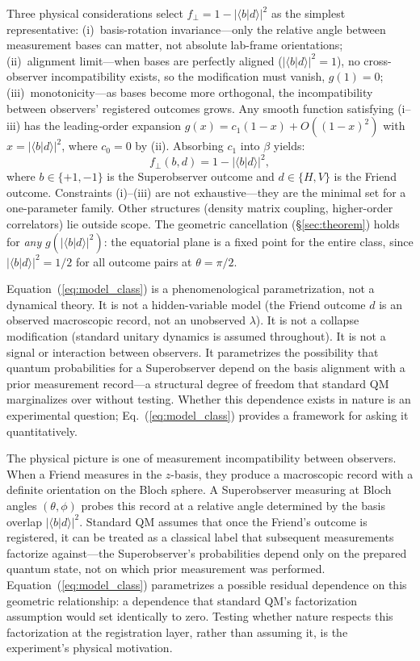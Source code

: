\documentclass[twocolumn,aps,pra,superscriptaddress,floatfix,10pt]{revtex4-2}
\begin{document}
Three physical considerations select $f_\perp = 1 - |\langle b|d\rangle|^2$ as
the simplest representative: (i)~basis-rotation invariance---only the relative
angle between measurement bases can matter, not absolute lab-frame orientations;
(ii)~alignment limit---when bases are perfectly aligned
($|\langle b|d\rangle|^2 = 1$), no cross-observer incompatibility exists, so
the modification must vanish, $g(1) = 0$; (iii)~monotonicity---as bases become
more orthogonal, the incompatibility between observers' registered outcomes
grows. Any smooth function satisfying (i--iii) has the leading-order expansion
$g(x) = c_1(1-x) + O((1-x)^2)$ with $x = |\langle b|d\rangle|^2$, where
$c_0 = 0$ by (ii). Absorbing $c_1$ into $\beta$ yields:
\begin{equation}
f_\perp(b,d) = 1 - |\langle b|d\rangle|^2,
\label{eq:fperp}
\end{equation}
where $b \in \{+1,-1\}$ is the Superobserver outcome and $d \in \{H,V\}$ is
the Friend outcome. Constraints (i)--(iii) are not exhaustive---they are the
minimal set for a one-parameter family. Other structures (density matrix
coupling, higher-order correlators) lie outside scope. The geometric
cancellation (\S\ref{sec:theorem}) holds for \emph{any}
$g(|\langle b|d\rangle|^2)$: the equatorial plane is a fixed point for the
entire class, since $|\langle b|d\rangle|^2 = 1/2$ for all outcome pairs at
$\theta = \pi/2$.

Equation~(\ref{eq:model_class}) is a phenomenological parametrization, not
a dynamical theory. It is not a hidden-variable model (the Friend outcome
$d$ is an observed macroscopic record, not an unobserved $\lambda$). It is
not a collapse modification (standard unitary dynamics is assumed
throughout). It is not a signal or interaction between observers. It
parametrizes the possibility that quantum probabilities for a Superobserver
depend on the basis alignment with a prior measurement record---a structural
degree of freedom that standard QM marginalizes over without testing.
Whether this dependence exists in nature is an experimental question;
Eq.~(\ref{eq:model_class}) provides a framework for asking it
quantitatively.

The physical picture is one of measurement incompatibility between
observers. When a Friend measures in the $z$-basis, they produce a
macroscopic record with a definite orientation on the Bloch sphere. A
Superobserver measuring at Bloch angles $(\theta,\phi)$ probes this
record at a relative angle determined by the basis overlap
$|\langle b|d\rangle|^2$. Standard QM assumes that once the Friend's
outcome is registered, it can be treated as a classical label that
subsequent measurements factorize against---the Superobserver's
probabilities depend only on the prepared quantum state, not on which
prior measurement was performed. Equation~(\ref{eq:model_class})
parametrizes a possible residual dependence on this geometric
relationship: a dependence that standard QM's factorization assumption
would set identically to zero. Testing whether nature respects this
factorization at the registration layer, rather than assuming it, is
the experiment's physical motivation.
\end{document}
